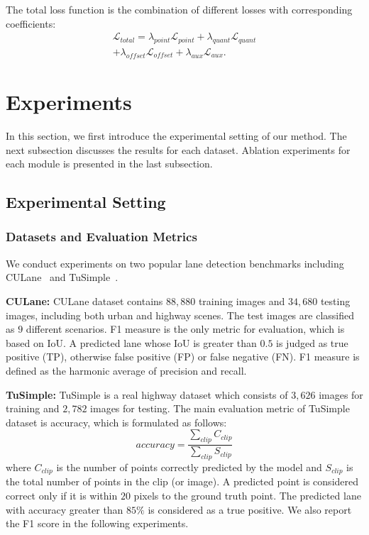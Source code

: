 \documentclass[10pt,twocolumn,letterpaper]{article}
\begin{document}
The total loss function is the combination of different losses with corresponding coefficients:
\begin{equation}
\label{equation:total loss}
\begin{split}
\mathcal{L}_{total} = \lambda_{point} \mathcal{L}_{point} + \lambda_{quant} \mathcal{L}_{quant} \\  + \lambda_{offset} \mathcal{L}_{offset} + \lambda_{aux} \mathcal{L}_{aux}.
\end{split}
\end{equation}


\section{Experiments}

In this section, we first introduce the experimental setting of our method. The next subsection discusses the results for each dataset. Ablation experiments for each module is presented in the last subsection.
\subsection{Experimental Setting}
\subsubsection{Datasets and Evaluation Metrics}
We conduct experiments on two popular lane detection benchmarks including CULane~\cite{pan2018spatial} and TuSimple~\cite{Tusimple}.

\textbf{CULane:} CULane dataset contains $88,880$ training images and $34,680$ testing images, including both urban and highway scenes. The test images are classified as $9$ different scenarios. F1 measure is the only metric for evaluation, which is based on IoU. A predicted lane whose IoU is greater than $0.5$ is judged as true positive (TP), otherwise false positive (FP) or false negative (FN). F1 measure is defined as the harmonic average of precision and recall.

\textbf{TuSimple:} TuSimple is a real highway dataset which consists of $3,626$ images for training and $2,782$ images for testing. The main evaluation metric of TuSimple dataset is accuracy, which is formulated as follows:
$$accuracy=\frac{\sum_{clip}{C_{clip}}}{\sum_{clip}{S_{clip}}}$$
where $C_{clip}$ is the number of points correctly predicted by the model and $S_{clip}$ is the total number of points in the clip (or image). A predicted point is considered correct only if it is within $20$ pixels to the ground truth point. The predicted lane with accuracy greater than $85\%$ is considered as a true positive. We also report the F1 score in the following experiments.
\end{document}
